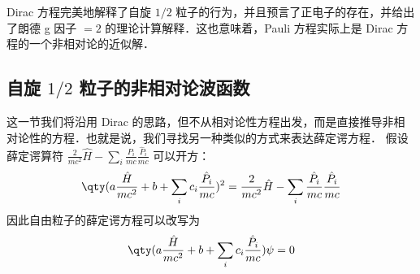 Dirac 方程完美地解释了自旋 $1/2$ 粒子的行为，并且预言了正电子的存在，并给出了朗德 g 因子 $=2$ 的理论计算解释．这也意味着，Pauli 方程实际上是 Dirac 方程的一个非相对论的近似解．

\subsection{自旋 $1/2$ 粒子的非相对论波函数}
这一节我们将沿用 Dirac 的思路，但不从相对论性方程出发，而是直接推导非相对论性的方程．也就是说，我们寻找另一种类似的方式来表达薛定谔方程．
假设薛定谔算符 $\frac{2}{mc^2} \hat H-\sum_i\frac{P_i}{mc}\frac{\hat P_i}{mc}$ 可以开方：
\begin{equation}
\qty(a\frac{\hat H}{mc^2}+b+\sum_ic_i \frac{\hat P_i}{mc})^2=\frac{2}{mc^2} \hat H-\sum_i\frac{\hat P_i}{mc}\frac{\hat P_i}{mc}
\end{equation}
因此自由粒子的薛定谔方程可以改写为
\begin{equation}\label{scheq2_eq2}
\qty(a\frac{\hat H}{mc^2}+b+\sum_ic_i \frac{\hat P_i}{mc})\psi=0
\end{equation}

